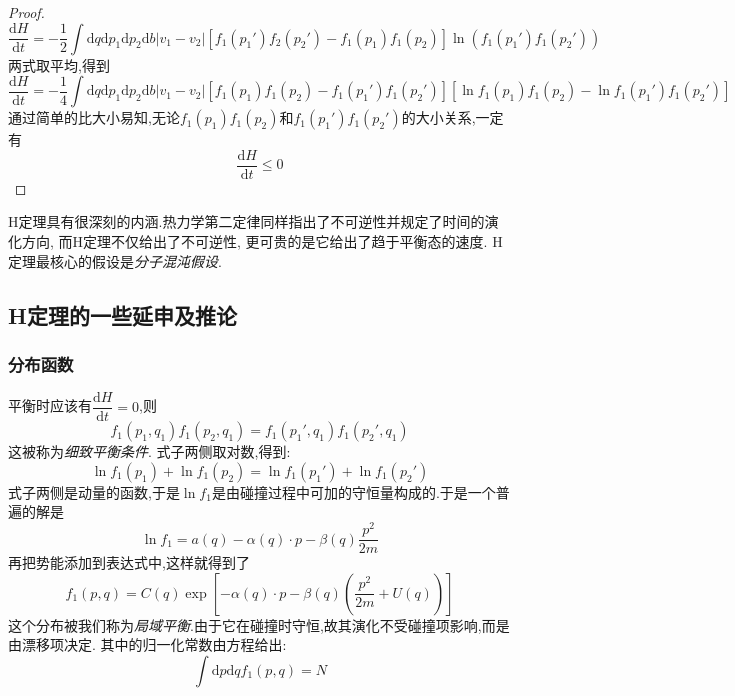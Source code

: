 \begin{proof}
      \[\dfrac{\mathrm{d}H}{\mathrm{d} t}=-\frac{1}{2}\int \mathrm{d} q \mathrm{d} p_1 \mathrm{d}  p_2 \mathrm{d} b \left\vert v_1- v_2 \right\vert \left[ f_1(p_1')f_2(p_2')-f_1(p_1)f_1(p_2) \right] \ln(f_1(p_1')f_1(p_2')) \]
      两式取平均,得到
      \begin{equation}
        \dfrac{\mathrm{d}H}{\mathrm{d} t}=-\frac{1}{4}\int \mathrm{d} q \mathrm{d} p_1 \mathrm{d} p_2 \mathrm{d} b \left\vert v_1-v_2 \right\vert \left[ f_1(p_1)f_1(p_2)-f_1(p_1')f_1(p_2')\right] \left[ \ln f_1(p_1)f_1(p_2)-\ln f_1(p_1')f_1(p_2') \right] 
      \end{equation}
      通过简单的比大小易知,无论$f_1(p_1)f_1(p_2)$和$f_1(p_1')f_1(p_2')$的大小关系,一定有
      \begin{equation}
        \dfrac{\mathrm{d}H}{\mathrm{d} t}\le 0
      \end{equation}
    \end{proof}

    H定理具有很深刻的内涵.热力学第二定律同样指出了不可逆性并规定了时间的演化方向, 而H定理不仅给出了不可逆性, 更可贵的是它给出了趋于平衡态的速度. H定理最核心的假设是\emph{分子混沌假设}.

\subsection{H定理的一些延申及推论}
\subsubsection*{分布函数}
    平衡时应该有$\dfrac{\mathrm{d}H}{\mathrm{d} t}=0$,则 
    \begin{equation}
      f_1(p_1,q_1)f_1(p_2,q_1)=f_1(p_1',q_1)f_1(p_2',q_1)
    \end{equation}
    这被称为\emph{细致平衡条件}. 式子两侧取对数,得到:
    \begin{equation}
      \ln f_1(p_1)+\ln f_1(p_2)=\ln f_1(p_1')+ \ln f_1(p_2')
    \end{equation}
    式子两侧是动量的函数,于是$\ln f_1$是由碰撞过程中可加的守恒量构成的.于是一个普遍的解是
    \begin{equation}
      \ln f_1= a(q)-\alpha(q) \cdot p -\beta(q) \frac{p^{2}}{2m}
    \end{equation}
    再把势能添加到表达式中,这样就得到了
    \begin{equation}
      f_1(p,q)=C(q) \exp\left[ -\alpha(q)\cdot p -\beta(q) \left( \frac{p^{2}}{2m}+U(q) \right)  \right] 
    \end{equation}
    这个分布被我们称为\emph{局域平衡}.由于它在碰撞时守恒,故其演化不受碰撞项影响,而是由漂移项决定. 其中的归一化常数由方程给出:
    \begin{equation}
      \int \mathrm{d} p \mathrm{d} q f_1(p,q)=N
    \end{equation}
      
